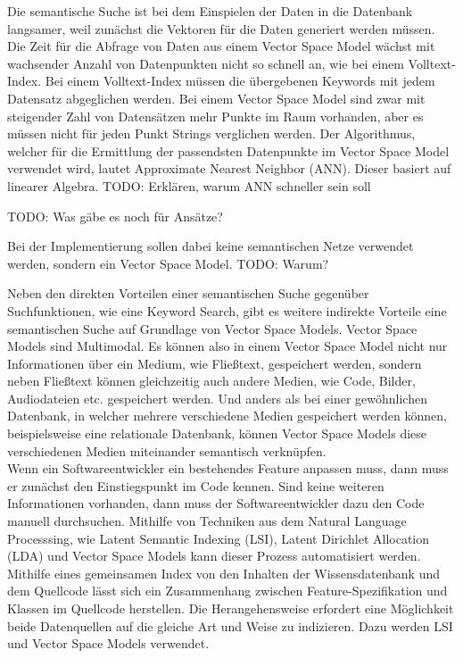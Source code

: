 Die semantische Suche ist bei dem Einspielen der Daten in die Datenbank langsamer, weil zunächst die Vektoren für die Daten generiert werden müssen.
Die Zeit für die Abfrage von Daten aus einem Vector Space Model wächst mit wachsender Anzahl von Datenpunkten nicht so schnell an, wie bei einem Volltext-Index.
Bei einem Volltext-Index müssen die übergebenen Keywords mit jedem Datensatz abgeglichen werden.
Bei einem Vector Space Model sind zwar mit steigender Zahl von Datensätzen mehr Punkte im Raum vorhanden, aber es müssen nicht für jeden Punkt Strings verglichen werden.
Der Algorithmus, welcher für die Ermittlung der passendsten Datenpunkte im Vector Space Model verwendet wird, lautet Approximate Nearest Neighbor (ANN).
Dieser basiert auf linearer Algebra.
TODO: Erklären, warum ANN schneller sein soll

TODO: Was gäbe es noch für Ansätze?

Bei der Implementierung sollen dabei keine semantischen Netze verwendet werden, sondern ein Vector Space Model.
TODO: Warum?

Neben den direkten Vorteilen einer semantischen Suche gegenüber Suchfunktionen, wie eine Keyword Search, gibt es weitere indirekte Vorteile eine semantischen Suche auf Grundlage von Vector Space Models.
Vector Space Models sind Multimodal.
Es können also in einem Vector Space Model nicht nur Informationen über ein Medium, wie Fließtext, gespeichert werden, sondern neben Fließtext können gleichzeitig auch andere Medien, wie Code, Bilder, Audiodateien etc. gespeichert werden.
Und anders als bei einer gewöhnlichen Datenbank, in welcher mehrere verschiedene Medien gespeichert werden können, beispielsweise eine relationale Datenbank, können Vector Space Models diese verschiedenen Medien miteinander semantisch verknüpfen.\\

Wenn ein Softwareentwickler ein bestehendes Feature anpassen muss, dann muss er zunächst den Einstiegspunkt im Code kennen.
Sind keine weiteren Informationen vorhanden, dann muss der Softwareentwickler dazu den Code manuell durchsuchen.
Mithilfe von Techniken aus dem Natural Language Processsing, wie Latent Semantic Indexing (LSI), Latent Dirichlet Allocation (LDA) und Vector Space Models kann dieser Prozess automatisiert werden.\cite{Dit_Revelle_Gethers_Poshyvanyk_2011}
Mithilfe eines gemeinsamen Index von den Inhalten der Wissensdatenbank und dem Quellcode lässt sich ein Zusammenhang zwischen Feature-Spezifikation und Klassen im Quellcode herstellen.
Die Herangehensweise erfordert eine Möglichkeit beide Datenquellen auf die gleiche Art und Weise zu indizieren.
Dazu werden LSI und Vector Space Models verwendet.\cite{Antoniol_Canfora_Casazza_DeLucia_2000}

